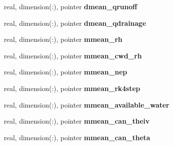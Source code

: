 \begin{DoxyCompactItemize}
\item 
\hypertarget{structed__state__vars_1_1sitetype_a14cf7752652b6e5998954030bf55312a}{
real, dimension(:), pointer {\bfseries dmean\_\-qrunoff}}
\label{structed__state__vars_1_1sitetype_a14cf7752652b6e5998954030bf55312a}

\item 
\hypertarget{structed__state__vars_1_1sitetype_ae736307c9fffd704d7688a54ff90be6b}{
real, dimension(:), pointer {\bfseries dmean\_\-qdrainage}}
\label{structed__state__vars_1_1sitetype_ae736307c9fffd704d7688a54ff90be6b}

\item 
\hypertarget{structed__state__vars_1_1sitetype_a57c16373339a7c9635cf82566590d9e0}{
real, dimension(:), pointer {\bfseries mmean\_\-rh}}
\label{structed__state__vars_1_1sitetype_a57c16373339a7c9635cf82566590d9e0}

\item 
\hypertarget{structed__state__vars_1_1sitetype_a5ac5cb02ed31f1974678242351ff4c5e}{
real, dimension(:), pointer {\bfseries mmean\_\-cwd\_\-rh}}
\label{structed__state__vars_1_1sitetype_a5ac5cb02ed31f1974678242351ff4c5e}

\item 
\hypertarget{structed__state__vars_1_1sitetype_ac41fec3bd50241290b51287369c9d025}{
real, dimension(:), pointer {\bfseries mmean\_\-nep}}
\label{structed__state__vars_1_1sitetype_ac41fec3bd50241290b51287369c9d025}

\item 
\hypertarget{structed__state__vars_1_1sitetype_ad7d92daf41edfc832ed71ab9a4c1d985}{
real, dimension(:), pointer {\bfseries mmean\_\-rk4step}}
\label{structed__state__vars_1_1sitetype_ad7d92daf41edfc832ed71ab9a4c1d985}

\item 
\hypertarget{structed__state__vars_1_1sitetype_a4c3be92ced7babf50ad09157c6360fdb}{
real, dimension(:), pointer {\bfseries mmean\_\-available\_\-water}}
\label{structed__state__vars_1_1sitetype_a4c3be92ced7babf50ad09157c6360fdb}

\item 
\hypertarget{structed__state__vars_1_1sitetype_a6509db719fe47d5faf7e0e06114f25f3}{
real, dimension(:), pointer {\bfseries mmean\_\-can\_\-theiv}}
\label{structed__state__vars_1_1sitetype_a6509db719fe47d5faf7e0e06114f25f3}

\item 
\hypertarget{structed__state__vars_1_1sitetype_aae7358dd4d36ba9b09d743540c20fd4b}{
real, dimension(:), pointer {\bfseries mmean\_\-can\_\-theta}}
\label{structed__state__vars_1_1sitetype_aae7358dd4d36ba9b09d743540c20fd4b}


\end{DoxyCompactItemize}
